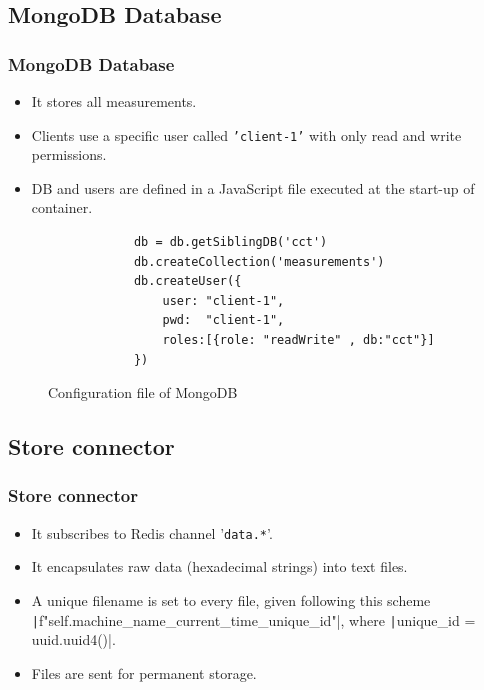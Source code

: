 \subsection{MongoDB Database}
\begin{frame}[containsverbatim]
	\frametitle{MongoDB Database}
	
	\begin{itemize}
		\item It stores all measurements.
		\item Clients use a specific user called \texttt{'client-1'} with only read and write permissions.
		\item DB and users are defined in a JavaScript file executed at the start-up of container.
	\end{itemize}
	
	\begin{figure}[h]
		\begin{verbatim}
			db = db.getSiblingDB('cct')
			db.createCollection('measurements')
			db.createUser({
				user: "client-1",
				pwd:  "client-1",
				roles:[{role: "readWrite" , db:"cct"}]
			})
		\end{verbatim}
		\caption{Configuration file of MongoDB}
	\end{figure}
	
	
\end{frame}


\subsection{Store connector}
\begin{frame}[containsverbatim]
	\frametitle{Store connector}
	
	\begin{itemize}
		\item It subscribes to Redis channel '\verb|data.*|'.
		\item It encapsulates raw data (hexadecimal strings) into text files.
		\item A unique filename is set to every file, given following this scheme
		\texttt|f"{self.machine_name}_{current_time}_{unique_id}"|,
		where \texttt|unique_id = uuid.uuid4()|.
		\item Files are sent for permanent storage.
	\end{itemize}
	
\end{frame}

